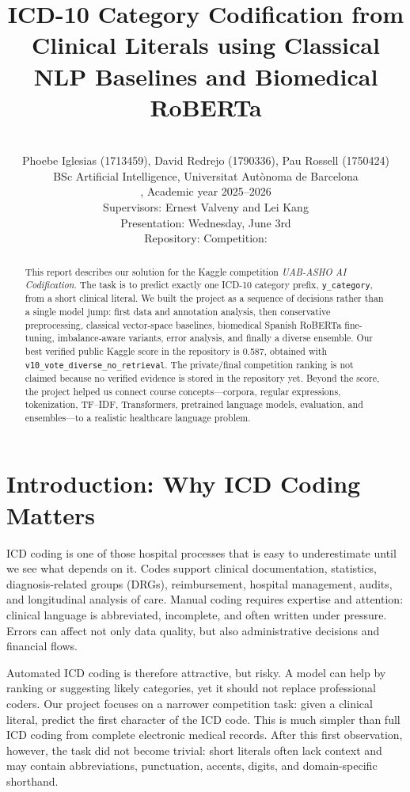 \documentclass[10pt,a4paper,twocolumn]{article}
\title{\vspace{-1.2em}\textbf{ICD-10 Category Codification from Clinical Literals using Classical NLP Baselines and Biomedical RoBERTa}}
\author{
  \team\\
  Phoebe Iglesias (1713459), David Redrejo (1790336), Pau Rossell (1750424)\\
  BSc Artificial Intelligence, Universitat Autònoma de Barcelona\\
  \course, Academic year 2025--2026\\
  Supervisors: Ernest Valveny and Lei Kang\\
  Presentation: Wednesday, June 3rd\\
  Repository: \repo \quad Competition: \kaggle
}
\date{}
\begin{document}
\maketitle

\begin{abstract}
This report describes our solution for the Kaggle competition \emph{UAB-ASHO AI Codification}. The task is to predict exactly one ICD-10 category prefix, \texttt{y\_category}, from a short clinical literal. We built the project as a sequence of decisions rather than a single model jump: first data and annotation analysis, then conservative preprocessing, classical vector-space baselines, biomedical Spanish RoBERTa fine-tuning, imbalance-aware variants, error analysis, and finally a diverse ensemble. Our best verified public Kaggle score in the repository is 0.587, obtained with \texttt{v10\_vote\_diverse\_no\_retrieval}. The private/final competition ranking is not claimed because no verified evidence is stored in the repository yet. Beyond the score, the project helped us connect course concepts---corpora, regular expressions, tokenization, TF--IDF, Transformers, pretrained language models, evaluation, and ensembles---to a realistic healthcare language problem.
\end{abstract}

\section{Introduction: Why ICD Coding Matters}

ICD coding is one of those hospital processes that is easy to underestimate until we see what depends on it. Codes support clinical documentation, statistics, diagnosis-related groups (DRGs), reimbursement, hospital management, audits, and longitudinal analysis of care. Manual coding requires expertise and attention: clinical language is abbreviated, incomplete, and often written under pressure. Errors can affect not only data quality, but also administrative decisions and financial flows.

Automated ICD coding is therefore attractive, but risky. A model can help by ranking or suggesting likely categories, yet it should not replace professional coders. Our project focuses on a narrower competition task: given a clinical literal, predict the first character of the ICD code. This is much simpler than full ICD coding from complete electronic medical records. After this first observation, however, the task did not become trivial: short literals often lack context and may contain abbreviations, punctuation, accents, digits, and domain-specific shorthand.
\end{document}
